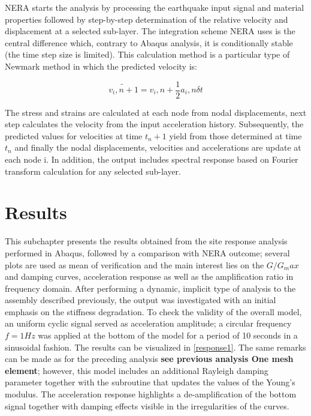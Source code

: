 \documentclass[10pt,a4paper]{report}
\begin{document}
NERA starts the analysis by processing the earthquake input signal and material properties followed by step-by-step determination of the relative velocity and displacement at a selected sub-layer. The integration scheme NERA uses is the central difference which, contrary to Abaqus analysis, it is conditionally stable (the time step size is limited). This calculation method is a particular type of Newmark method in which the predicted velocity is:

\begin{equation}
	\tilde{v_i,n+1}=v_i,n+\frac{1}{2}a_i,n\delta t
\end{equation}

The stress and strains are calculated at each node from nodal displacements, next step calculates the velocity from the input acceleration history. Subsequently, the predicted values for velocities at time $t_n+1$ yield from those determined at time $t_n$ and finally the nodal displacements, velocities and accelerations are update at each node i. In addition, the output includes spectral response based on Fourier transform calculation for any selected sub-layer.

\section{Results}
This subchapter presents the results obtained from the site response analysis performed in Abaqus, followed by a comparison with NERA outcome; several plots are used as mean of verification and the main interest lies on the $G/G_max$ and damping curves, acceleration response as well as the amplification ratio in frequency domain.
After performing a dynamic, implicit type of analysis to the assembly described previously, the output was investigated with an initial emphasis on the stiffness degradation. To check the validity of the overall model, an uniform cyclic signal served as acceleration amplitude; a circular frequency $f=1 Hz$ was applied at the bottom of the model for a period of 10 seconds in a sinusoidal fashion. The results can be visualized in \ref{response1}. The same remarks can be made as for the preceding analysis \textbf{see previous analysis One mesh element}; however, this model includes an additional Rayleigh damping parameter together with the subroutine that updates the values of the Young's modulus. The acceleration response highlights a de-amplification of the bottom signal together with damping effects visible in the irregularities of the curves.
\end{document}
